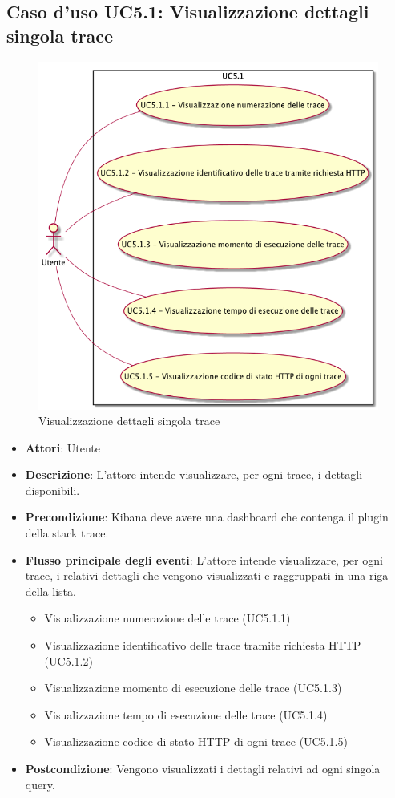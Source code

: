 \subsection{Caso d'uso UC5.1: Visualizzazione dettagli singola trace}
\begin{figure} [H]
	\centering
	\includegraphics[scale=0.45]{./UC/UC5-1.png}
	\caption{Visualizzazione dettagli singola trace}\label{}
\end{figure}
\begin{itemize}
	\item \textbf{Attori}: Utente
	\item \textbf{Descrizione}: L'attore intende visualizzare, per ogni trace, i dettagli disponibili.
	\item \textbf{Precondizione}: Kibana deve avere una dashboard che contenga il plugin della stack trace.
	\item \textbf{Flusso principale degli eventi}: L'attore intende visualizzare, per ogni trace, i relativi dettagli che vengono visualizzati e raggruppati in una riga della lista.
	\begin{itemize}
		\item Visualizzazione numerazione delle trace (UC5.1.1)
		\item Visualizzazione identificativo delle trace tramite richiesta HTTP (UC5.1.2)
		\item Visualizzazione momento di esecuzione delle trace (UC5.1.3)
		\item Visualizzazione tempo di esecuzione delle trace (UC5.1.4)
		\item Visualizzazione codice di stato HTTP di ogni trace (UC5.1.5)
	\end{itemize}
	\item \textbf{Postcondizione}: Vengono visualizzati i dettagli relativi ad ogni singola query.
\end{itemize}
